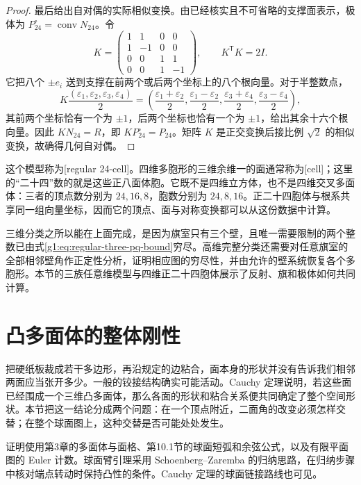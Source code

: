 \begin{proof}
	最后给出自对偶的实际相似变换。由已经核实且不可省略的支撑面表示，极体为 \(P_{24}^\circ=\operatorname{conv}N_{24}\)。令
	\[
		K=
		\begin{pmatrix}
			1&1&0&0\\
			1&-1&0&0\\
			0&0&1&1\\
			0&0&1&-1
		\end{pmatrix},\qquad K^{\mathsf T}K=2I.
	\]
	它把八个 \(\pm e_i\) 送到支撑在前两个或后两个坐标上的八个根向量。对于半整数点，
	\[
		K\frac{(\varepsilon_1,\varepsilon_2,\varepsilon_3,\varepsilon_4)}2
		=\left(\frac{\varepsilon_1+\varepsilon_2}2,
		\frac{\varepsilon_1-\varepsilon_2}2,
		\frac{\varepsilon_3+\varepsilon_4}2,
		\frac{\varepsilon_3-\varepsilon_4}2\right),
	\]
	其前两个坐标恰有一个为 \(\pm1\)，后两个坐标也恰有一个为 \(\pm1\)，给出其余十六个根向量。因此 \(KN_{24}=R\)，即 \(KP_{24}^\circ=P_{24}\)。矩阵 \(K\) 是正交变换后接比例 \(\sqrt2\) 的相似变换，故确得几何自对偶。
\end{proof}

这个模型称为[regular 24-cell]。四维多胞形的三维余维一的面通常称为[cell]；这里的“二十四”数的就是这些正八面体胞。它既不是四维立方体，也不是四维交叉多面体：三者的顶点数分别为 \(24,16,8\)，胞数分别为 \(24,8,16\)。正二十四胞体与根系共享同一组向量坐标，因而它的顶点、面与对称变换都可以从这份数据中计算。

\ProseParagraphBreak

三维分类之所以能在上面完成，是因为旗室只有三个壁，且唯一需要限制的两个整数已由式\eqref{g1:eq:regular-three-pq-bound}穷尽。高维完整分类还需要对任意旗室的全部相邻壁角作正定性分析，证明相应图的穷尽性，并由允许的壁系统恢复各个多胞形。本节的三族任意维模型与四维正二十四胞体展示了反射、旗和极体如何共同计算。

\section{凸多面体的整体刚性}
\label{g1:sec:E04}

把硬纸板裁成若干多边形，再沿规定的边粘合，面本身的形状并没有告诉我们相邻两面应当张开多少。一般的铰接结构确实可能活动。Cauchy 定理说明，若这些面已经围成一个三维凸多面体，那么各面的形状和粘合关系便共同确定了整个空间形状。本节把这一结论分成两个问题：在一个顶点附近，二面角的改变必须怎样交替；在整个球面图上，这种交替是否可能处处发生。

\ProseParagraphBreak

证明使用第3章的多面体与面格、第10.1节的球面短弧和余弦公式，以及有限平面图的 Euler 计数。球面臂引理采用 Schoenberg--Zaremba 的归纳思路\cite[第3节，第1070--1071页]{SchoenbergZaremba1967CauchyLemma}，在归纳步骤中核对端点转动时保持凸性的条件。Cauchy 定理的球面链接路线也可见\cite[第14章，第95--96页]{AignerZiegler2018Proofs}。

